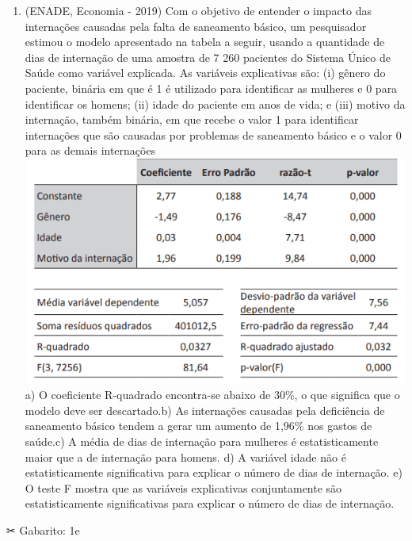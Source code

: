 \documentclass[
]{book}
\providecommand{\tightlist}{%
  \setlength{\itemsep}{0pt}\setlength{\parskip}{0pt}}
\begin{document}
\begin{question}

\begin{enumerate}
\def\labelenumi{\arabic{enumi}.}
\tightlist
\item
  (ENADE, Economia - 2019) Com o objetivo de entender o impacto das
  internações causadas pela falta de saneamento básico, um pesquisador
  estimou o modelo apresentado na tabela a seguir, usando a quantidade
  de dias de internação de uma amostra de 7 260 pacientes do Sistema
  Único de Saúde como variável explicada. As variáveis explicativas são:
  (i) gênero do paciente, binária em que é 1 é utilizado para
  identificar as mulheres e 0 para identificar os homens; (ii) idade do
  paciente em anos de vida; e (iii) motivo da internação, também
  binária, em que recebe o valor 1 para identificar internações que são
  causadas por problemas de saneamento básico e o valor 0 para as demais
  internações\includegraphics{./img/exercicio_regressao.png}a) O
  coeficiente R-quadrado encontra-se abaixo de 30\%, o que significa que
  o modelo deve ser descartado.b) As internações causadas pela
  deficiência de saneamento básico tendem a gerar um aumento de 1,96\%
  nos gastos de saúde.c) A média de dias de internação para mulheres é
  estatisticamente maior que a de internação para homens. d) A variável
  idade não é estatisticamente significativa para explicar o número de
  dias de internação. e) O teste F mostra que as variáveis explicativas
  conjuntamente são estatisticamente significativas para explicar o
  número de dias de internação.\\
\end{enumerate}

\end{question}

\begin{mirror}

✂ Gabarito: 1e

\end{mirror}
\end{document}
